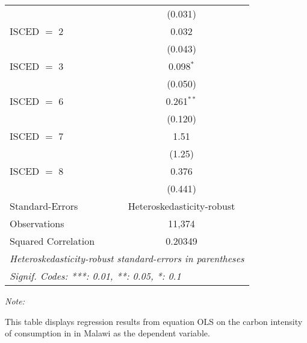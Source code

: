 \begin{table}[htbp!]
\begin{adjustbox}{width = 1\textwidth, max height = 0.95\textheight, center}
\begin{threeparttable}[b]
\begin{tabular}{lc}
                                & (0.031)\\   
            ISCED $=$ 2         & 0.032\\   
                                & (0.043)\\   
            ISCED $=$ 3         & 0.098$^{*}$\\   
                                & (0.050)\\   
            ISCED $=$ 6         & 0.261$^{**}$\\   
                                & (0.120)\\   
            ISCED $=$ 7         & 1.51\\   
                                & (1.25)\\   
            ISCED $=$ 8         & 0.376\\   
                                & (0.441)\\   
            \midrule 
            Standard-Errors     & Heteroskedasticity-robust \\   
            Observations        & 11,374\\  
            Squared Correlation & 0.20349\\  
            \midrule \midrule
            \multicolumn{2}{l}{\emph{Heteroskedasticity-robust standard-errors in parentheses}}\\
            \multicolumn{2}{l}{\emph{Signif. Codes: ***: 0.01, **: 0.05, *: 0.1}}\\
         \end{tabular}
         
         \begin{tablenotes}\item \medskip \textit{Note:}
            \item This table displays regression results from equation OLS on the carbon intensity of consumption in  in Malawi as the dependent variable. 
         \end{tablenotes}
      \end{threeparttable}
   \end{adjustbox}
\end{table}


